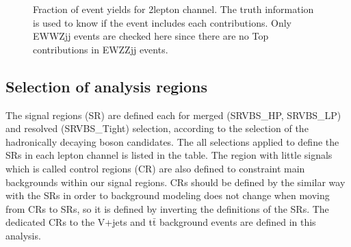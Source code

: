 \begin{figure}[H]
    \centering
        \caption{Fraction of event yields for 2lepton channel. The truth information is used to know if the event includes each contributions. Only EWWZjj events are checked here since there are no Top contributions in EWZZjj events.}
        \label{fig:TruthTop2LepPurity}
\end{figure}

\subsection{Selection of analysis regions}
The signal regions (SR) are defined each for merged (SRVBS\_HP, SRVBS\_LP) and resolved (SRVBS\_Tight) selection, according to the selection of the hadronically decaying boson candidates. The all selections applied to define the SRs in each lepton channel is listed in the table.
The region with little signals which is called control regions (CR) are also defined to constraint main backgrounds within our signal regions. 
CRs should be defined by the similar way with the SRs in order to background modeling does not change when moving from CRs to SRs, so it is defined by inverting the definitions of the SRs.
The dedicated CRs to the V+jets and t$\bar{\mathrm{t}}$ background events are defined in this analysis. \\ \\


